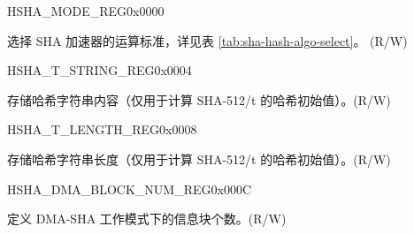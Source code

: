 \begin{register}{H}{SHA\_MODE\_REG}{0x{}0000}\label{regdesc:SHAMODEREG}
%
%
\regnewline%
\begin{regdesc}\begin{reglist}
\label{fielddesc:SHAMODE}\item [SHA\_MODE] 选择 SHA 加速器的运算标准，详见表 \ref{tab:sha-hash-algo-select}。 (R/W)
\end{reglist}\end{regdesc}
\end{register}


\begin{register}{H}{SHA\_T\_STRING\_REG}{0x{}0004}\label{regdesc:SHATSTRINGREG}
%
\regnewline%
\begin{regdesc}\begin{reglist}
\label{fielddesc:SHATSTRING}\item [SHA\_T\_STRING] 存储哈希字符串内容（仅用于计算 SHA-512/t 的哈希初始值）。(R/W)
\end{reglist}\end{regdesc}
\end{register}


\begin{register}{H}{SHA\_T\_LENGTH\_REG}{0x{}0008}\label{regdesc:SHATLENGTHREG}
%
%
\regnewline%
\begin{regdesc}\begin{reglist}
\label{fielddesc:SHATLENGTH}\item [SHA\_T\_LENGTH] 存储哈希字符串长度（仅用于计算 SHA-512/t 的哈希初始值）。(R/W)
\end{reglist}\end{regdesc}
\end{register}


\begin{register}{H}{SHA\_DMA\_BLOCK\_NUM\_REG}{0x{}000C}\label{regdesc:SHADMABLOCKNUMREG}
%
%
\regnewline%
\begin{regdesc}\begin{reglist}
\label{fielddesc:SHADMABLOCKNUM}\item [SHA\_DMA\_BLOCK\_NUM] 定义 DMA-SHA 工作模式下的信息块个数。(R/W)
\end{reglist}\end{regdesc}
\end{register}

